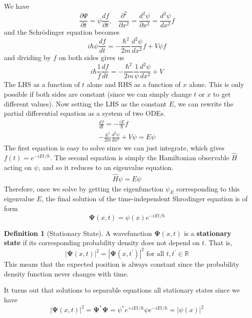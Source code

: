 \documentclass{article}
\theoremstyle{definition}
\newtheorem{definition}{Definition}[section]
\begin{document}
  We have 
  \begin{equation} 
    \frac{\partial \Psi}{\partial t} = \psi \frac{d f}{\partial t} , \;\;\; \frac{\partial^2}{\partial x^2} = \frac{d^2 \psi}{\partial x^2} = \frac{d^2 \psi}{d x^2} f
  \end{equation}
  and the Schr\"odinger equation becomes 
  \begin{equation} 
    i \hbar \psi \frac{d f}{d t} = -\frac{\hbar^2}{2m}\frac{d^2 \psi}{d x^2} f + V \psi f
  \end{equation}
  and dividing by $f$ on both sides gives us 
  \begin{equation} 
    i \hbar \frac{1}{f} \frac{df}{dt} = -\frac{\hbar^2}{2m} \frac{1}{\psi} \frac{d^2 \psi}{d x^2} + V
  \end{equation}
  The LHS as a function of $t$ alone and RHS as a function of $x$ alone. This is only possible if both sides are constant (since we can simply change $t$ or $x$ to get different values). Now setting the LHS as the constant $E$, we can rewrite the partial differential equation as a system of two ODEs. 
  \begin{align} 
    \frac{df}{dt} = - \frac{i E}{\hbar} f \\
    - \frac{\hbar^2}{2m} \frac{d^2 \psi}{dx^2} + V \psi = E \psi
  \end{align}
  The first equation is easy to solve since we can just integrate, which gives $f(t) = e^{-i E t/ \hbar}$. The second equation is simply the Hamiltonian observable $\hat{H}$ acting on $\psi$, and so it reduces to an eigenvalue equation.  
  \begin{align} 
    \hat{H} \psi = E \psi
  \end{align}
  Therefore, once we solve by getting the eigenfunction $\psi_E$ corresponding to this eigenvalue $E$, the final solution of the time-independent Shrodinger equation is of form 
  \begin{equation} 
    \boldsymbol{\Psi}(x, t) = \psi(x) e^{-i E t/\hbar}  
  \end{equation}

  \begin{definition}[Stationary State]
    A wavefunction $\boldsymbol{\Psi}(x, t)$ is a \textbf{stationary state} if its corresponding probability density does not depend on $t$. That is, 
    \begin{equation} 
      |\boldsymbol{\Psi}(x, t)|^2 = |\boldsymbol{\Psi}(x, t^\prime)|^2  \text{ for all } t, t^\prime \in \mathbb{R}
    \end{equation}
    This means that the expected position is always constant since the probability density function never changes with time. 
  \end{definition}

  It turns out that solutions to separable equations all stationary states since we have 
  \begin{equation} 
    |\boldsymbol{\Psi}(x, t)|^2 = \boldsymbol{\Psi}^\ast \boldsymbol{\Psi} = \psi^\ast e^{+i E t/\hbar} \psi e^{- i E t/\hbar} = |\psi (x)|^2
  \end{equation}
 
\end{document}
